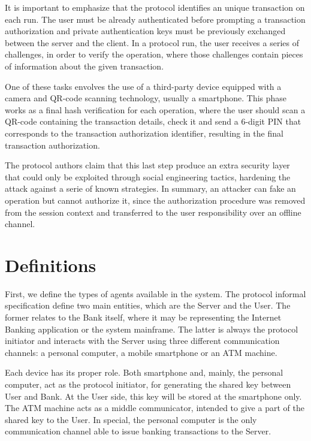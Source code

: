 It is important to emphasize that the protocol identifies an unique transaction on each run. The user must be already authenticated before prompting a transaction authorization and private authentication keys must be previously exchanged between the server and the client. In a protocol run, the user receives a series of challenges, in order to verify the operation, where those challenges contain pieces of information about the given transaction.

One of these tasks envolves the use of a third-party device equipped with a camera and QR-code scanning technology, usually a smartphone. This phase works as a final hash verification for each operation, where the user should scan a QR-code containing the transaction details, check it and send a 6-digit PIN that corresponds to the transaction authorization identifier, resulting in the final transaction authorization.

The protocol authors claim that this last step produce an extra security layer that could only be exploited through social engineering tactics, hardening the attack against a serie of known strategies. In summary, an attacker can fake an operation but cannot authorize it, since the authorization procedure was removed from the session context and transferred to the user responsibility over an offline channel.





\section{Definitions}
First, we define the types of agents available in the system. The protocol informal specification define two main entities, which are the Server and the User. The former relates to the Bank itself, where it may be representing the Internet Banking application or the system mainframe. The latter is always the protocol initiator and interacts with the Server using three different communication channels: a personal computer, a mobile smartphone or an ATM machine.

Each device has its proper role. Both smartphone and, mainly, the personal computer, act as the protocol initiator, for generating the shared key between User and Bank. At the User side, this key will be stored at the smartphone only. The ATM machine acts as a middle communicator, intended to give a part of the shared key to the User. In special, the personal computer is the only communication channel able to issue banking transactions to the Server.


